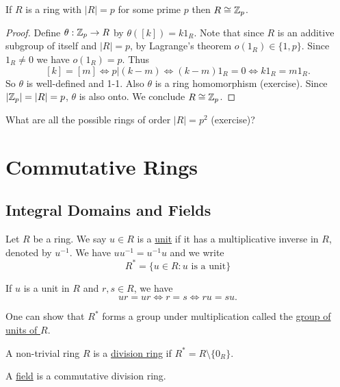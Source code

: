 \documentclass[11pt]{article}
\begin{document}
\begin{proposition}
    If $R$ is a ring with $|R|=p$ for some prime $p$ then $R\cong\mathbb{Z}_p$.
\end{proposition}

\begin{proof}
    Define $\theta:\mathbb{Z}_p\to R$ by $\theta([k])=k1_R$. Note that since $R$ is an additive subgroup of itself and $|R|=p$, by Lagrange's theorem $o(1_R)\in\{1,p\}$. Since $1_R\neq0$ we have $o(1_R)=p$. Thus
    \[[k]=[m]\iff p|(k-m)\iff(k-m)1_R=0\iff k1_R=m1_R.\]
    So $\theta$ is well-defined and 1-1. Also $\theta$ is a ring homomorphism (exercise). Since $|\mathbb{Z}_p|=|R|=p$, $\theta$ is also onto. We conclude $R\cong \mathbb{Z}_p$.
\end{proof}

\begin{example}
    What are all the possible rings of order $|R|=p^2$ (exercise)?
\end{example}

\section{Commutative Rings}

\subsection{Integral Domains and Fields}

\begin{definition}[Units]
    Let $R$ be a ring. We say $u\in R$ is a \ul{unit} if it has a multiplicative inverse in $R$, denoted by $u^{-1}$. We have $uu^{-1}=u^{-1}u$ and we write
    \[R^*=\{u\in R:\text{$u$ is a unit}\}\]
\end{definition}

\begin{note} If $u$ is a unit in $R$ and $r,s\in R$, we have
\[ur=ur\iff r=s\iff ru=su.\]
\end{note}

\begin{remark}
    One can show that $R^*$ forms a group under multiplication called the \ul{group of units of $R$}.
\end{remark}

\begin{definition}
    A non-trivial ring $R$ is a \ul{division ring} if $R^*=R\setminus\{0_R\}$.
\end{definition}

\begin{definition}[Fields]
    A \ul{field} is a commutative division ring.
\end{definition}
\end{document}
